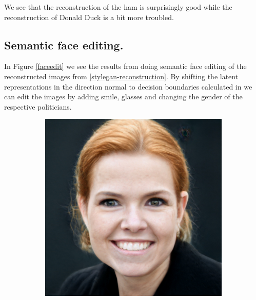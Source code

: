 We see that the reconstruction of the ham is surprisingly good while the reconstruction of Donald Duck is a bit more troubled.

\subsection{Semantic face editing.}
In Figure \ref{faceedit} we see the results from doing semantic face editing of the reconstructed images from \ref{stylegan-reconstruction}. By shifting the latent representations in the direction normal to decision boundaries calculated in \cite{interfacegan} we can edit the images by adding smile, glasses and changing the gender of the respective politicians.

\begin{figure}[h!]
    \centering
    \begin{subfigure}[b]{0.24\textwidth}
        \includegraphics[width=\textwidth]{fig/stylegan/faceedit/inger-smile}
    \end{subfigure}
    \begin{subfigure}[b]{0.24\textwidth}

\end{subfigure}
\end{figure}
